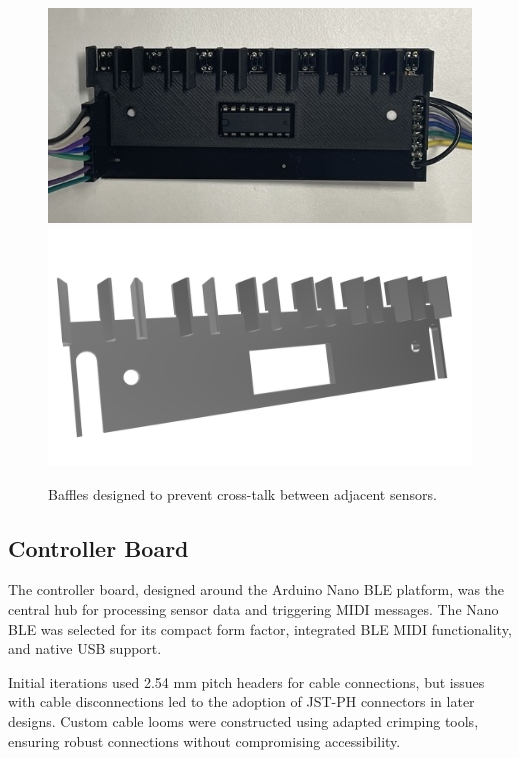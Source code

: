\begin{figure}
    \centering
    \includegraphics[width=\linewidth]{src/images/sensor-board-w-baffles.jpeg}
    \\
    \includegraphics[width=\linewidth]{src/images/baffles.png}
    \caption{Baffles designed to prevent cross-talk between adjacent sensors.}
    \label{fig:baffles}
\end{figure}
\subsection{Controller Board}\label{controller-board}

The controller board, designed around the Arduino Nano BLE platform, was the central hub for processing sensor data and triggering MIDI messages. The Nano BLE was selected for its compact form factor, integrated BLE MIDI functionality, and native USB support. 

Initial iterations used 2.54 mm pitch headers for cable connections, but issues with cable disconnections led to the adoption of JST-PH connectors in later designs. Custom cable looms were constructed using adapted crimping tools, ensuring robust connections without compromising accessibility.


